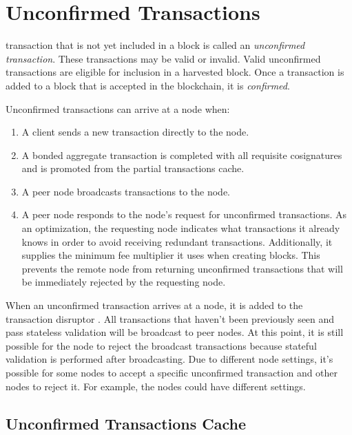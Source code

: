 \section{Unconfirmed Transactions}
\label{sec:unconfirmedTransactions}

\nemquote{
}{}

 transaction that is not yet included in a block is called an \textit{unconfirmed transaction}.
These transactions may be valid or invalid.
Valid unconfirmed transactions are eligible for inclusion in a harvested block.
Once a transaction is added to a block that is accepted in the blockchain, it is \textit{confirmed}.

Unconfirmed transactions can arrive at a node when:
\begin{enumerate}
	\item{A client sends a new transaction directly to the node.}
	\item{A bonded aggregate transaction is completed with all requisite cosignatures and is promoted from the partial transactions cache.}
	\item{A peer node broadcasts transactions to the node.}
	\item{A peer node responds to the node's request for unconfirmed transactions.
	As an optimization, the requesting node indicates what transactions it already knows in order to avoid receiving redundant transactions.
	Additionally, it supplies the minimum fee multiplier  it uses when creating blocks.
	This prevents the remote node from returning unconfirmed transactions that will be immediately rejected by the requesting node.}
\end{enumerate}

When an unconfirmed transaction arrives at a node, it is added to the transaction disruptor .
All transactions that haven't been previously seen and pass stateless validation will be broadcast to peer nodes.
At this point, it is still possible for the node to reject the broadcast transactions because stateful validation is performed after broadcasting.
Due to different node settings, it's possible for some nodes to accept a specific unconfirmed transaction and other nodes to reject it.
For example, the nodes could have different  settings.

\subsection{Unconfirmed Transactions Cache}

